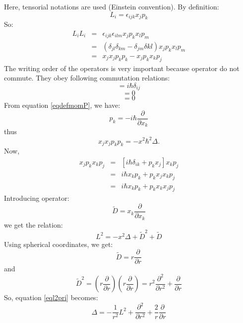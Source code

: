 \documentclass[12pt]{book}
\begin{document}
\begin{pf}
Here, tensorial notations are used (Einstein convention). By definition:
\begin{equation}
L_i=\epsilon_{ijk}x_jp_k
\end{equation}
So:
\begin{eqnarray}
L_iL_i&=&\epsilon_{ijk}\epsilon_{ilm}x_{j}p_k x_l p_m\\
&=&(\delta_{jl}\delta_{km}-\delta_{jm}\delta{kl})x_{j}p_kx_l p_m\\
&=&x_jx_jp_kp_k-x_jp_kx_kp_j
\end{eqnarray}
The writing order of the operators is very important because operator do not
commute. They obey following commutation relations:
\begin{equation}
[x_i,p_j]=i \hbar \delta_{ij}
\end{equation}
\begin{equation}
[x_j,x_k]=0
\end{equation}
\begin{equation}
[p_j,p_k]=0
\end{equation}
From equation \ref{eqdefmomP}, we have:
\begin{equation}
p_k=-i\hbar \frac{\partial}{\partial x_k}
\end{equation}
thus
\begin{equation}
x_jx_jp_kp_k=-x^2\hbar^2\Delta.
\end{equation}
Now,
\begin{eqnarray}
x_jp_kx_kp_j&=&[i\hbar\delta_{ik}+p_kx_j]x_kp_j\\
&=&i\hbar x_kp_k+p_kx_jx_kp_j\\
&=&i\hbar x_kp_k+p_kx_kx_jp_j
\end{eqnarray}
Introducing operator:
\begin{equation}
\tilde D=x_k\frac{\partial}{\partial x_k}
\end{equation}
we get the relation:
\begin{equation}\label{eql2pri}
L^2=-x^2\Delta+\tilde D^2+\tilde D
\end{equation}
Using spherical coordinates, we get:
\begin{equation}
\tilde D=r\frac{\partial}{\partial r}
\end{equation}
and
\begin{equation}
\tilde D^2=(r\frac{\partial}{\partial r})(r\frac{\partial}{\partial
r})=r^2\frac{\partial^2}{\partial r^2}+\frac{\partial}{\partial r}
\end{equation}
So, equation \ref{eql2pri} becomes:
\begin{equation}
\Delta=-\frac{1}{r^2}L^2+\frac{\partial^2}{\partial
r^2}+\frac{2}{r}\frac{\partial}{\partial r}
\end{equation}
\end{pf}
\end{document}
